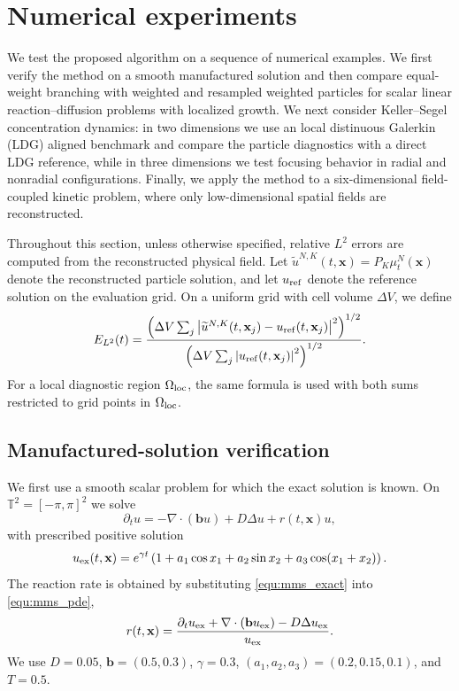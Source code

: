 \documentclass[a4paper,fleqn]{cas-sc}
\theoremstyle{definition}
\theoremstyle{remark}
\begin{document}
\section{Numerical experiments}
\label{sec:numerics}

We test the proposed algorithm on a sequence of numerical examples.  We first verify
the method on a smooth manufactured solution and then compare equal-weight branching
with weighted and resampled weighted particles for scalar linear reaction--diffusion
problems with localized growth.  We next consider Keller--Segel concentration dynamics:
in two dimensions we use an local distinuous Galerkin (LDG) aligned benchmark and compare the particle diagnostics
with a direct LDG reference, while in three dimensions we test focusing behavior in radial
and nonradial configurations.  Finally, we apply the method to a six-dimensional
field-coupled kinetic problem, where only low-dimensional spatial fields are reconstructed.

Throughout this section, unless otherwise specified, relative \(L^2\) errors are computed
from the reconstructed physical field.  Let
\(
\widetilde u^{N,K}(t,\mathbf x)=P_K\mu_t^N(\mathbf x)
\)
denote the reconstructed particle solution, and let \(u_{\rm ref}\) denote the reference
solution on the evaluation grid.  On a uniform grid with cell volume \(\Delta V\), we define
\begin{equation}
E_{L^2}(t)
=
\frac{
\left(\Delta V\sum_j
\left|\widetilde u^{N,K}(t,\mathbf x_j)-u_{\rm ref}(t,\mathbf x_j)\right|^2\right)^{1/2}
}{
\left(\Delta V\sum_j
\left|u_{\rm ref}(t,\mathbf x_j)\right|^2\right)^{1/2}
}.
\label{eq:num_L2_error}
\end{equation}
For a local diagnostic region \(\Omega_{\rm loc}\), the same formula is used with both
sums restricted to grid points in \(\Omega_{\rm loc}\).

\subsection{Manufactured-solution verification}
\label{sec:mms}

We first use a smooth scalar problem for which the exact solution is known.  On $\mathbb T^2=[-\pi,\pi]^2$ we solve
\begin{equation}
\partial_t u=-\nabla\cdot(\mathbf b u)+D\Delta u+r(t,\mathbf x)u,
\label{equ:mms_pde}
\end{equation}
with prescribed positive solution
\begin{equation}
 u_{\rm ex}(t,\mathbf x)=e^{\gamma t}\left(1+a_1\cos x_1+a_2\sin x_2+a_3\cos(x_1+x_2)\right).
\label{equ:mms_exact}
\end{equation}
The reaction rate is obtained by substituting \eqref{equ:mms_exact} into \eqref{equ:mms_pde},
\begin{equation}
 r(t,\mathbf x)=\frac{\partial_t u_{\rm ex}+\nabla\cdot(\mathbf b u_{\rm ex})-D\Delta u_{\rm ex}}{u_{\rm ex}}.
\label{equ:mms_r}
\end{equation}
We use $D=0.05$, $\mathbf b=(0.5,0.3)$, $\gamma=0.3$, $(a_1,a_2,a_3)=(0.2,0.15,0.1)$, and $T=0.5$.
\end{document}
